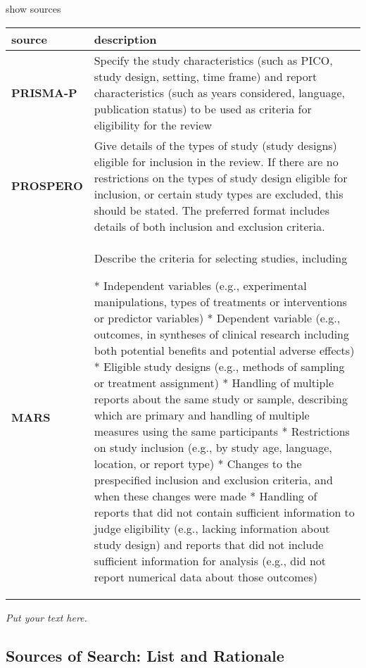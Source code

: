\documentclass[]{article}
\begin{document}
show sources

\hypertarget{eiaec}{}
\begin{table}[H]
\centering
\begin{tabular}{>{\bfseries}l|l}
\hline
\rowcolor[HTML]{ececec}  source & description\\
\hline
PRISMA-P & Specify the study characteristics (such as PICO, study design, setting, time frame) and report characteristics (such as years considered, language, publication status) to be used as criteria for eligibility for the review\\
\hline
PROSPERO & Give details of the types of study (study designs) eligible for inclusion in the review. If there are no restrictions on the types of study design eligible for inclusion, or certain study types are excluded, this should be stated. The preferred format includes details of both inclusion and exclusion criteria.\\
\hline
MARS & Describe the criteria for selecting studies, including

* Independent variables (e.g., experimental manipulations, types of treatments or interventions or predictor variables)
* Dependent variable (e.g., outcomes, in syntheses of clinical research including both potential benefits and potential adverse effects)
* Eligible study designs (e.g., methods of sampling or treatment assignment)
* Handling of multiple reports about the same study or sample, describing which are primary and handling of multiple measures using the same participants
* Restrictions on study inclusion (e.g., by study age, language, location, or report type)
* Changes to the prespecified inclusion and exclusion criteria, and when these changes were made
* Handling of reports that did not contain sufficient information to judge eligibility (e.g., lacking information about study design) and reports that did not include sufficient information for analysis (e.g., did not report numerical data about those outcomes)\\
\hline
\end{tabular}
\end{table}

\emph{Put your text here.}

\hypertarget{sources-of-search-list-and-rationale}{%
\subsection{Sources of Search: List and
Rationale}\label{sources-of-search-list-and-rationale}}
\end{document}
